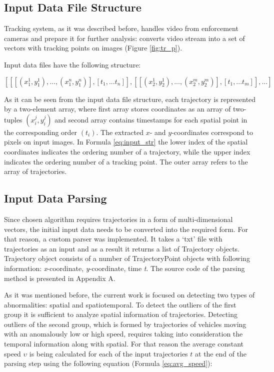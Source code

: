 \subsection{Input Data File Structure}

Tracking system, as it was described before, handles video from enforcement cameras and prepare it for further analysis: converts video stream into a set of vectors with tracking points on images (Figure \ref{fig:tr_p}).

Input data files have the following structure:

\begin{equation} \label{eq:input_str}
	[[[(x_1^1, y_1^1), ..., (x_1^n, y_1^n)], [t_1, ... t_n]], [[(x_2^1, y_2^1), ..., (x_2^m, y_2^m)], [t_1, ... t_m]], ...]
\end{equation}

As it can be seen from the input data file structure, each trajectory is represented by a two-element array, where first array stores coordinates as an array of two-tuples $(x_i^j, y_i^j)$ and second array contains timestamps for each spatial point in the corresponding order $(t_i)$. The extracted $x$- and $y$-coordinates correspond to pixels on input images. In Formula \ref{eq:input_str} the lower index of the spatial coordinates indicates the ordering number of a trajectory, while the upper index indicates the ordering number of a tracking point. The outer array refers to the array of trajectories.

\subsection{Input Data Parsing}

Since chosen algorithm requires trajectories in a form of multi-dimensional vectors, the initial input data needs to be converted into the required form. For that reason, a custom parser was implemented. It takes a ‘txt’ file with trajectories as an input and as a result it returns a list of Trajectory objects. Trajectory object consists of a number of TrajectoryPoint objects with following information: \textit{x}-coordinate, \textit{y}-coordinate, time \textit{t}. The source code of the parsing method is presented in Appendix A.

As it was mentioned before, the current work is focused on detecting two types of abnormalities: spatial and spatiotemporal. To detect the outliers of the first group it is sufficient to analyze spatial information of trajectories. Detecting outliers of the second group, which is formed by trajectories of vehicles moving with an anomalously low or high speed, requires taking into consideration the temporal information along with spatial. For that reason the average constant speed $\upsilon$ is being calculated for each of the input trajectories $t$ at the end of the parsing step using the following equation (Formula \ref{eq:avg_speed}):

